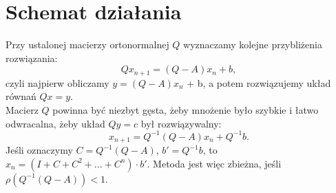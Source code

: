 \section{Schemat działania}
Przy ustalonej macierzy ortonormalnej \( Q \) wyznaczamy kolejne przybliżenia rozwiązania:
\[
    Qx_{n+1} = (Q - A)x_n + b,
\]
czyli najpierw obliczamy \( y = (Q - A)x_n \) + b, a potem rozwiązujemy układ równań \( Qx = y \). \\
Macierz \( Q \) powinna być niezbyt gęsta, żeby mnożenie było szybkie i łatwo odwracalna, żeby układ \( Qy = c \) był rozwiązywalny:
\[
    x_{n+1} = Q^{-1}(Q - A)x_n + Q^{-1}b.
\]
Jeśli oznaczymy \( C = Q^{−1}(Q - A) \), \( b' = Q^{-1}b \), to \( x_n = (I + C + C^2 + . . . + C^n) \cdot b' \). Metoda jest więc zbieżna, jeśli \( \rho(Q^{-1}(Q - A)) < 1 \).